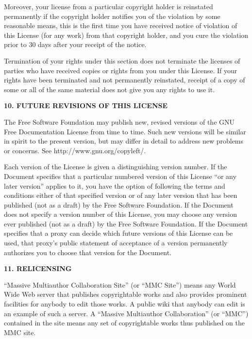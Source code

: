 \documentclass[10pt,a4paper,ngerman,titlepage,tocindentauto]{article}
\begin{document}
\begin{multicols}{3}
{				Moreover, your license from a particular copyright holder is
				reinstated permanently if the copyright holder notifies you of the
				violation by some reasonable means, this is the first time you have
				received notice of violation of this License (for any work) from that
				copyright holder, and you cure the violation prior to 30 days after
				your receipt of the notice.

				Termination of your rights under this section does not terminate the
				licenses of parties who have received copies or rights from you under
				this License.  If your rights have been terminated and not permanently
				reinstated, receipt of a copy of some or all of the same material does
				not give you any rights to use it.


				\begin{center}
				{\bf 10. FUTURE REVISIONS OF THIS LICENSE\par}
				\end{center}

				The Free Software Foundation may publish new, revised versions
				of the GNU Free Documentation License from time to time.  Such new
				versions will be similar in spirit to the present version, but may
				differ in detail to address new problems or concerns.  See
				http://www.gnu.org/copyleft/.

				Each version of the License is given a distinguishing version number.
				If the Document specifies that a particular numbered version of this
				License ``or any later version'' applies to it, you have the option of
				following the terms and conditions either of that specified version or
				of any later version that has been published (not as a draft) by the
				Free Software Foundation.  If the Document does not specify a version
				number of this License, you may choose any version ever published (not
				as a draft) by the Free Software Foundation.  If the Document
				specifies that a proxy can decide which future versions of this
				License can be used, that proxy's public statement of acceptance of a
				version permanently authorizes you to choose that version for the
				Document.


				\begin{center}
				{\bf 11. RELICENSING\par}
				\end{center}

				``Massive Multiauthor Collaboration Site'' (or ``MMC Site'') means any
				World Wide Web server that publishes copyrightable works and also
				provides prominent facilities for anybody to edit those works.  A
				public wiki that anybody can edit is an example of such a server.  A
				``Massive Multiauthor Collaboration'' (or ``MMC'') contained in the
				site means any set of copyrightable works thus published on the MMC
				site.

}
\end{multicols}
\end{document}
